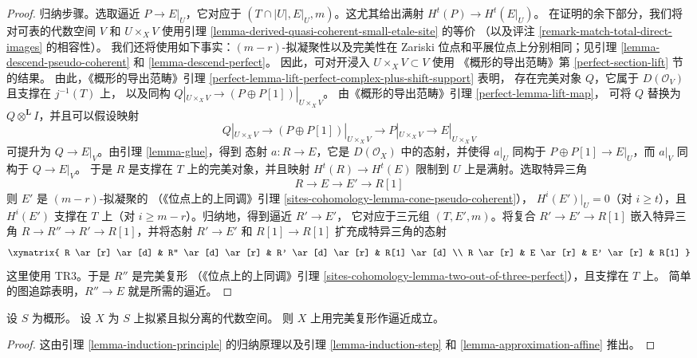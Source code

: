 \begin{proof}
\medskip\noindent
归纳步骤。选取逼近 $P \to E|_U$，它对应于
$(T \cap |U|, E|_U, m)$。这尤其给出满射
$H^t(P) \to H^t(E|_U)$。
在证明的余下部分，我们将对可表的代数空间 $V$ 和
$U \times_X V$ 使用引理
\ref{lemma-derived-quasi-coherent-small-etale-site} 的等价
（以及评注 \ref{remark-match-total-direct-images} 的相容性）。
我们还将使用如下事实：$(m - r)$-拟凝聚性以及完美性在
Zariski 位点和平展位点上分别相同；见引理
\ref{lemma-descend-pseudo-coherent} 和
\ref{lemma-descend-perfect}。
因此，可对开浸入 $U \times_X V \subset V$ 使用
《概形的导出范畴》第 \ref{perfect-section-lift} 节的结果。
由此，《概形的导出范畴》引理
\ref{perfect-lemma-lift-perfect-complex-plus-shift-support} 表明，
存在完美对象 $Q$，它属于 $D(\mathcal{O}_V)$ 且支撑在 $j^{-1}(T)$ 上，
以及同构
$Q|_{U \times_X V} \to (P \oplus P[1])|_{U \times_X V}$。
由《概形的导出范畴》引理 \ref{perfect-lemma-lift-map}，
可将 $Q$ 替换为 $Q \otimes^\mathbf{L} I$，并且可以假设映射
$$
Q|_{U \times_X V} \longrightarrow
(P \oplus P[1])|_{U \times_X V} \longrightarrow
P|_{U \times_X V} \longrightarrow E|_{U \times_X V}
$$
可提升为 $Q \to E|_V$。由引理 \ref{lemma-glue}，得到
态射 $a : R \to E$，它是 $D(\mathcal{O}_X)$ 中的态射，并使得 $a|_U$
同构于 $P \oplus P[1] \to E|_U$，而 $a|_V$ 同构于
$Q \to E|_V$。%
于是 $R$ 是支撑在 $T$ 上的完美对象，并且映射
$H^t(R) \to H^t(E)$ 限制到 $U$ 上是满射。选取特异三角
$$
R \to E \to E' \to R[1]
$$
则 $E'$ 是 $(m - r)$-拟凝聚的
（《位点上的上同调》引理
\ref{sites-cohomology-lemma-cone-pseudo-coherent}），
$H^i(E')|_U = 0$（对 $i \geq t$），且 $H^i(E')$ 支撑在
$T$ 上（对 $i \geq m - r$）。归纳地，得到逼近 $R' \to E'$，
它对应于三元组 $(T, E', m)$。将复合
$R' \to E' \to R[1]$ 嵌入特异三角
$R \to R'' \to R' \to R[1]$，并将态射 $R' \to E'$ 和
$R[1] \to R[1]$ 扩充成特异三角的态射
$$
\xymatrix{
R \ar[r] \ar[d] & R'' \ar[d] \ar[r] & R' \ar[d] \ar[r] & R[1] \ar[d] \\
R \ar[r] &  E \ar[r] & E' \ar[r] & R[1]
}
$$
这里使用 TR3。于是 $R''$ 是完美复形
（《位点上的上同调》引理
\ref{sites-cohomology-lemma-two-out-of-three-perfect}），且支撑在 $T$ 上。
简单的图追踪表明，$R'' \to E$ 就是所需的逼近。
\end{proof}

\begin{theorem}
\label{theorem-approximation}
设 $S$ 为概形。
设 $X$ 为 $S$ 上拟紧且拟分离的代数空间。
则 $X$ 上用完美复形作逼近成立。
\end{theorem}

\begin{proof}
这由引理 \ref{lemma-induction-principle} 的归纳原理以及引理
\ref{lemma-induction-step} 和 \ref{lemma-approximation-affine} 推出。
\end{proof}







